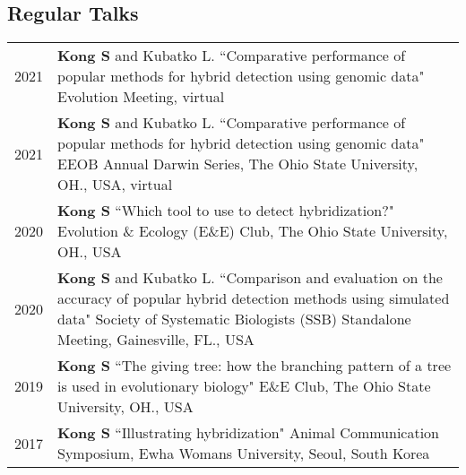 \documentclass[11pt]{article}
\begin{document}
\subsection*{Regular Talks}
\begin{longtable}{p{}  p{}}
2021 & \textbf{Kong S} and Kubatko L.  ``Comparative performance of popular methods for hybrid detection using genomic data" Evolution Meeting, virtual \textit{} \vspace{10pt} \\ 




2021 & \textbf{Kong S} and Kubatko L.  ``Comparative performance of popular methods for hybrid detection using genomic data" EEOB Annual Darwin Series, The Ohio State University, OH., USA, virtual \vspace{10pt} \\ 
2020 & \textbf{Kong S} ``Which tool to use to detect hybridization?" Evolution \& Ecology (E\&E) Club, The Ohio State University, OH., USA \vspace{10pt} \\
2020 & \textbf{Kong S} and Kubatko L.  ``Comparison and evaluation on the accuracy of popular hybrid detection methods using simulated data" Society of Systematic Biologists (SSB) Standalone Meeting, Gainesville, FL., USA \vspace{10pt} \\ 
2019 &  \textbf{Kong S} ``The giving tree: how the branching pattern of a tree is used in evolutionary biology" E\&E Club, The Ohio State University, OH., USA \vspace{10pt} \\  

2017 & \textbf{Kong S} ``Illustrating hybridization" Animal Communication Symposium, Ewha Womans University, Seoul, South Korea \vspace{10pt} \\  

\end{longtable}
\end{document}

